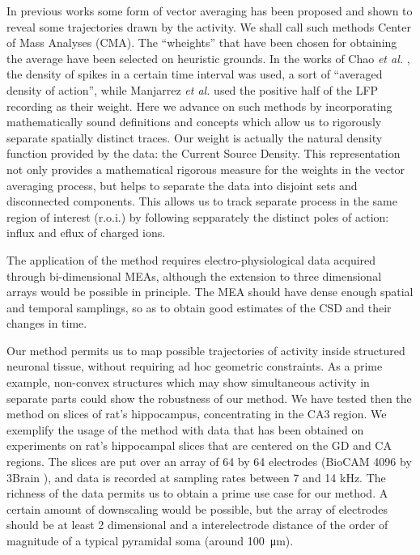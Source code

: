 \documentclass[12pt]{article}
\newcommand{\mum}[1]{\SI{#1}{\micro\metre}}
\begin{document}
In previous works some form of vector averaging has been proposed and shown to reveal some trajectories drawn by the activity. We shall call such methods Center of Mass Analyses (CMA).  The ``wheights'' that have been chosen for obtaining the average have been selected on heuristic grounds. In the works of Chao \emph{et al.} \cite{Chao05, Chao07}, the density of spikes in a certain time interval was used, a sort of ``averaged density of action'', while Manjarrez \emph{et al.} \cite{Manjarrez07, Manjarrez09} used the positive half of the LFP recording as their weight. 
Here we advance on such methods by incorporating mathematically sound definitions and concepts which allow us to rigorously separate spatially distinct traces. Our weight is actually the natural density function provided by the data: the Current Source Density. This representation not only provides a mathematical rigorous  measure for the weights in the vector averaging process, but helps to separate the data into disjoint sets and disconnected components.
This allows us to track separate process in the same region of interest
(r.o.i.) by following sepparately the distinct poles of action: influx and
eflux of charged ions. 

The application of the method requires electro-physiological data acquired
through bi-dimensional MEAs, although the extension to three dimensional arrays would be possible in principle. The MEA should have dense enough spatial and temporal samplings, so as to obtain good estimates of the CSD and their changes in time.

Our method permits us to map possible trajectories of activity inside structured neuronal tissue, without requiring ad hoc geometric constraints. As a prime example, non-convex structures which may show simultaneous activity in separate parts could show the robustness of our method. We have tested then the method on slices of rat's hippocampus, concentrating in the CA3 region. We exemplify the usage of the method with data that has been obtained on experiments on rat's hippocampal slices that are centered on the GD and CA
regions. The slices are put over an array of 64 by 64 electrodes
(BioCAM 4096 by 3Brain \cite{BioCam}),
and data is recorded at sampling rates between 7 and 14 kHz. The richness of the
data permits us to obtain a prime use case for our method. A
 certain amount of downscaling would be 
possible, but the array of electrodes should be at least 2 dimensional and
a interelectrode distance of the order of magnitude of a typical pyramidal soma
(around \mum{100}). 
\end{document}
